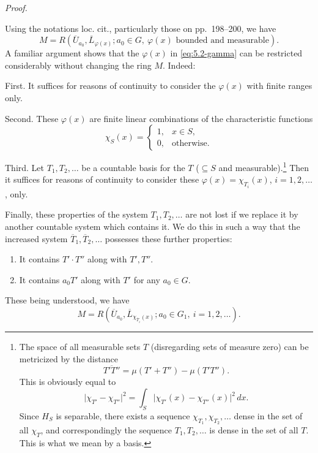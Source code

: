 \documentclass[b5paper,twoside]{article}
\theoremstyle{mvnplain}
\renewenvironment{proof}[1][Proof]{%
  \par\addvspace{0.35\baselineskip}%
  \noindent\textit{#1.}\ \normalfont\ignorespaces
}{%
  \par\addvspace{0.35\baselineskip}%
}
\newcommand{\M}{\mathbf M}
\newcommand{\R}{\mathbf R}
\newcommand{\Hilbert}{\mathfrak H}
\def\M{M}%
\def\R{R}%
\def\Hilbert{H}%
\def\mathfrak#1{#1}%
\begin{document}
\begin{proof}
Using the notations loc. cit., particularly those on pp.~198--200, we have
\begin{equation}\tag{5.2.\(\gamma\)}\label{eq:5.2-gamma}
 \M=\R(\overline U_{a_0},\overline L_{\varphi(x)};
 a_0\in\mathfrak G,\ \varphi(x)\text{ bounded and measurable}).
\end{equation}
A familiar argument shows that the \(\varphi(x)\) in \eqref{eq:5.2-gamma}
can be restricted considerably without changing the ring \(\M\). Indeed:

First. It suffices for reasons of continuity to consider the \(\varphi(x)\)
with finite ranges only.

Second. These \(\varphi(x)\) are finite linear combinations of the
characteristic functions
\[
 \chi_S(x)=\begin{cases}1,&x\in S,\\0,&\text{otherwise}.
 \end{cases}
\]

Third. Let \(T_1,T_2,\ldots\) be a countable basis for the \(T\)
(\(\subseteq S\) and measurable).\footnote{The space of all measurable sets
\(T\) (disregarding sets of measure zero) can be metricized by the distance
\[
 \overline{T'T''}=\mu(T'+T'')-\mu(T'T'').
\]
This is obviously equal to
\[
 \lvert\chi_{T'}-\chi_{T''}\rvert^2
 =\int_S\lvert\chi_{T'}(x)-\chi_{T''}(x)\rvert^2\,dx.
\]
Since \(\Hilbert_S\) is separable, there exists a sequence
\(\chi_{T_1},\chi_{T_2},\ldots\) dense in the set of all \(\chi_T\), and
correspondingly the sequence \(T_1,T_2,\ldots\) is dense in the set of all
\(T\). This is what we mean by a basis.} Then it suffices for reasons of
continuity to consider these \(\varphi(x)=\chi_{T_i}(x)\),
\(i=1,2,\ldots\), only.

Finally, these properties of the system \(T_1,T_2,\ldots\) are not lost if we
replace it by another countable system which contains it. We do this in such a
way that the increased system \(\overline T_1,\overline T_2,\ldots\)
possesses these further properties:
\begin{enumerate}[label=(\arabic*)]
\item It contains \(T'\cdot T''\) along with \(T',T''\).
\item It contains \(a_0T'\) along with \(T'\) for any
\(a_0\in\mathfrak G\).
\end{enumerate}
These being understood, we have
\begin{equation}\tag{5.2.\(\delta\)}\label{eq:5.2-delta}
 \M=\R(\overline U_{a_0},\overline L_{\chi_{\overline T_i}(x)};
 a_0\in\mathfrak G_1,\ i=1,2,\ldots).
\end{equation}


\end{proof}
\end{document}
